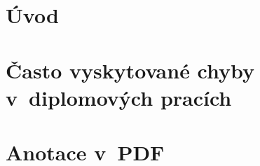 
%





\chapter{Úvod}

\dummyText

\dummyText[2]

\dummyText





\chapter{Často vyskytované chyby v~diplomových pracích}





\chapter{Anotace v~PDF}





